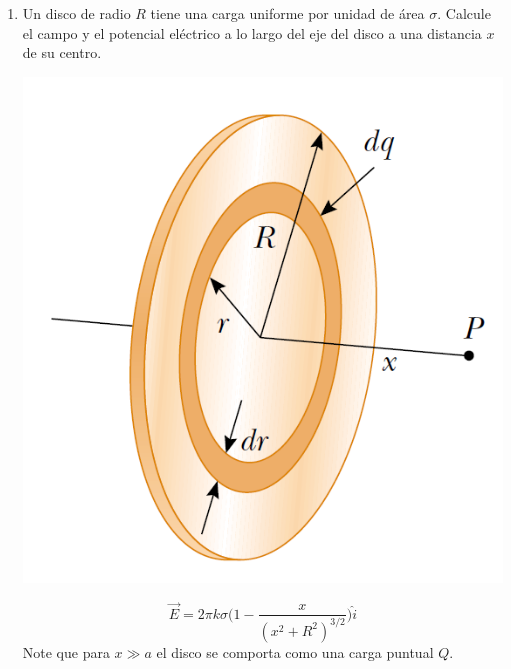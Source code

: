 \documentclass[11pt,twocolumn]{article}
\begin{document}
\begin{enumerate}
\item Un disco de radio $R$ tiene una carga uniforme por unidad de área $\sigma$. Calcule el campo y el potencial eléctrico a lo largo del eje del disco a una distancia $x$ de su centro.
{
\begin{center}
\includegraphics[scale=0.2]{disco}
\end{center}
}
\begin{displaymath}
\vec{E}=2\pi k \sigma \Big(1-\dfrac{x}{(x^2+R^2)^{3/2}}\Big)\hat{i}
\end{displaymath}
\small{Note que para $x\gg a$ el disco se comporta como una carga puntual $Q$.} 


\end{enumerate}
\end{document}

